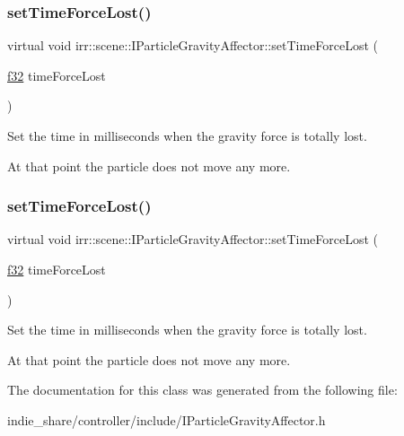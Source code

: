 \subsubsection{\texorpdfstring{set\+Time\+Force\+Lost()}{setTimeForceLost()}\hspace{0.1cm}{\footnotesize\ttfamily [1/2]}}
{\footnotesize\ttfamily virtual void irr\+::scene\+::\+I\+Particle\+Gravity\+Affector\+::set\+Time\+Force\+Lost (\begin{DoxyParamCaption}\item[{\hyperlink{namespaceirr_a0277be98d67dc26ff93b1a6a1d086b07}{f32}}]{time\+Force\+Lost }\end{DoxyParamCaption})\hspace{0.3cm}{\ttfamily [pure virtual]}}



Set the time in milliseconds when the gravity force is totally lost. 

At that point the particle does not move any more. \mbox{\label{classirr_1_1scene_1_1IParticleGravityAffector_a3910d872c740e678373cecbd5523ad38}} 
\subsubsection{\texorpdfstring{set\+Time\+Force\+Lost()}{setTimeForceLost()}\hspace{0.1cm}{\footnotesize\ttfamily [2/2]}}
{\footnotesize\ttfamily virtual void irr\+::scene\+::\+I\+Particle\+Gravity\+Affector\+::set\+Time\+Force\+Lost (\begin{DoxyParamCaption}\item[{\hyperlink{namespaceirr_a0277be98d67dc26ff93b1a6a1d086b07}{f32}}]{time\+Force\+Lost }\end{DoxyParamCaption})\hspace{0.3cm}{\ttfamily [pure virtual]}}



Set the time in milliseconds when the gravity force is totally lost. 

At that point the particle does not move any more. 

The documentation for this class was generated from the following file\+:\begin{DoxyCompactItemize}
\item 
indie\+\_\+share/controller/include/I\+Particle\+Gravity\+Affector.\+h\end{DoxyCompactItemize}
